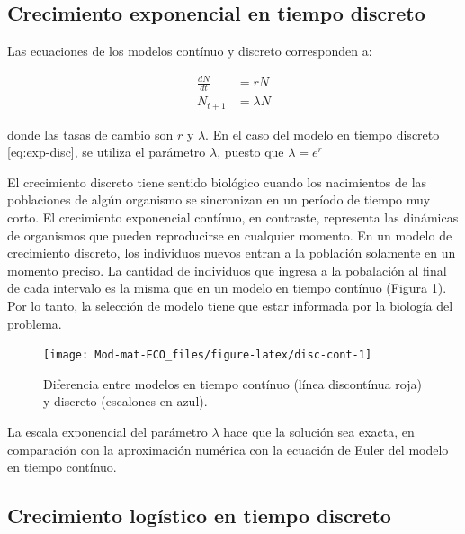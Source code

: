 \documentclass[
]{book}
\begin{document}
\hypertarget{crecimiento-exponencial-en-tiempo-discreto}{%
\subsection{Crecimiento exponencial en tiempo discreto}\label{crecimiento-exponencial-en-tiempo-discreto}}

Las ecuaciones de los modelos contínuo y discreto corresponden a:

\begin{align}
\frac{dN}{dt} & = rN \label{eq:exp-cont} \\
N_{t+1} & = \lambda N \label{eq:exp-disc} 
\end{align}

donde las tasas de cambio son \(r\) y \(\lambda\). En el caso del modelo en tiempo discreto \eqref{eq:exp-disc}, se utiliza el parámetro \(\lambda\), puesto que \(\lambda = e^r\)

El crecimiento discreto tiene sentido biológico cuando los nacimientos de las poblaciones de algún organismo se sincronizan en un período de tiempo muy corto. El crecimiento exponencial contínuo, en contraste, representa las dinámicas de organismos que pueden reproducirse en cualquier momento. En un modelo de crecimiento discreto, los individuos nuevos entran a la población solamente en un momento preciso. La cantidad de individuos que ingresa a la pobalación al final de cada intervalo es la misma que en un modelo en tiempo contínuo (Figura \ref{fig:disc-cont}). Por lo tanto, la selección de modelo tiene que estar informada por la biología del problema.

\begin{figure}

{\centering \texttt{[image: Mod-mat-ECO\_files/figure-latex/disc-cont-1]} 

}

\caption{Diferencia entre modelos en tiempo contínuo (línea discontínua roja) y discreto (escalones en azul).}\label{fig:disc-cont}
\end{figure}

La escala exponencial del parámetro \(\lambda\) hace que la solución sea exacta, en comparación con la aproximación numérica con la ecuación de Euler del modelo en tiempo contínuo.

\hypertarget{crecimiento-loguxedstico-en-tiempo-discreto}{%
\subsection{Crecimiento logístico en tiempo discreto}\label{crecimiento-loguxedstico-en-tiempo-discreto}}
\end{document}
